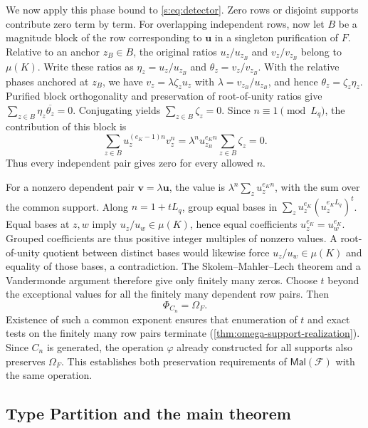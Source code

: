 \documentclass[11pt,letterpaper,onecolumn]{article}
\theoremstyle{plain}
\theoremstyle{definition}
\theoremstyle{remark}
\newcommand{\cF}{\mathcal F}
\newcommand{\Mal}{\mathsf{Mal}}
\newcommand{\SuppRel}[1]{\Phi_{#1}}
\newcommand{\RowEq}[1]{\Omega_{#1}}
\begin{document}
We now apply this phase bound to \eqref{s:eq:detector}.
Zero rows or disjoint supports contribute zero term by term.
For overlapping independent rows, now let $B$ be a magnitude block of
the row corresponding to $\mathbf u$ in a singleton purification of $F$.
Relative to an anchor $z_B\in B$, the
original ratios $u_z/u_{z_B}$ and $v_z/v_{z_B}$ belong to $\mu(K)$.
Write these ratios as $\eta_z=u_z/u_{z_B}$ and
$\theta_z=v_z/v_{z_B}$. With the relative phases anchored at $z_B$,
we have $v_z=\lambda\zeta_zu_z$ with $\lambda=v_{z_B}/u_{z_B}$,
and hence $\theta_z=\zeta_z\eta_z$.
Purified block orthogonality and preservation of root-of-unity ratios
give $\sum_{z\in B}\eta_z\overline{\theta_z}=0$.
Conjugating yields $\sum_{z\in B}\zeta_z=0$.
Since $n\equiv1\pmod{L_q}$,
the contribution of this block is
\[
 \sum_{z\in B}u_z^{(e_K-1)n}v_z^n
 =\lambda^n u_{z_B}^{e_Kn}\sum_{z\in B}\zeta_z=0.
\]
Thus every independent pair gives zero for every allowed $n$.

For a nonzero dependent pair $\mathbf v=\lambda\mathbf u$, the
value is $\lambda^n\sum_z u_z^{e_Kn}$, with the sum over the common
support. Along $n=1+tL_q$, group equal bases in
$\sum_z u_z^{e_K}(u_z^{e_KL_q})^t$.
Equal bases at $z,w$ imply $u_z/u_w\in\mu(K)$, hence equal coefficients
$u_z^{e_K}=u_w^{e_K}$. Grouped coefficients are thus positive integer
multiples of nonzero values. A root-of-unity quotient between distinct
bases would likewise force $u_z/u_w\in\mu(K)$ and equality of those
bases, a contradiction. The
Skolem--Mahler--Lech theorem and a Vandermonde argument therefore
give only finitely many zeros. Choose $t$ beyond the exceptional
values for all the finitely many dependent row pairs. Then
\[
 \SuppRel{C_n}=\RowEq F.
\]
Existence of such a common exponent ensures that enumeration of $t$
and exact tests on the finitely many row pairs terminate
(\cref{thm:omega-support-realization}). Since $C_n$ is generated,
the operation $\varphi$ already constructed for all supports also
preserves $\RowEq F$. This establishes both preservation requirements
of $\Mal(\cF)$ with the same operation.

\subsection{Type Partition and the main theorem}
\end{document}

